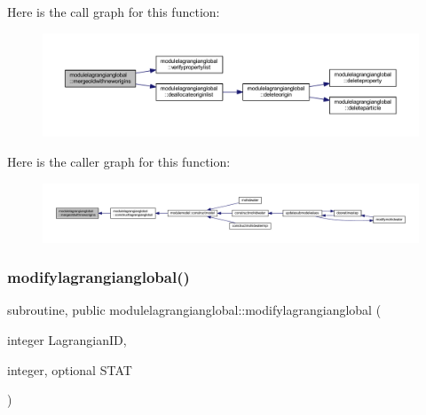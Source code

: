 Here is the call graph for this function\+:\nopagebreak
\begin{figure}[H]
\begin{center}
\leavevmode
\includegraphics[width=350pt]{namespacemodulelagrangianglobal_a615ab3a1eadb5c6d09f9fe8642d2c59f_cgraph}
\end{center}
\end{figure}
Here is the caller graph for this function\+:\nopagebreak
\begin{figure}[H]
\begin{center}
\leavevmode
\includegraphics[width=350pt]{namespacemodulelagrangianglobal_a615ab3a1eadb5c6d09f9fe8642d2c59f_icgraph}
\end{center}
\end{figure}
\mbox{\label{namespacemodulelagrangianglobal_a658b1fd9232553dc9130f4f03e93e4c1}} 
\subsubsection{\texorpdfstring{modifylagrangianglobal()}{modifylagrangianglobal()}}
{\footnotesize\ttfamily subroutine, public modulelagrangianglobal\+::modifylagrangianglobal (\begin{DoxyParamCaption}\item[{integer}]{Lagrangian\+ID,  }\item[{integer, optional}]{S\+T\+AT }\end{DoxyParamCaption})}

